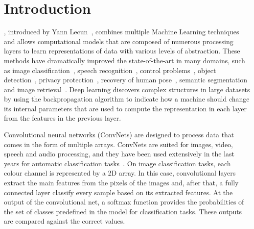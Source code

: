 \documentclass[journal]{IEEEtran}
\begin{document}
	\section{Introduction}
	\label{sect:introduction}
	, introduced by Yann Lecun~\cite{lecun2015deep}, combines multiple Machine Learning techniques and allows computational models that are composed of numerous processing layers to learn representations of data with various levels of abstraction. These methods have dramatically improved the state-of-the-art in many domains, such as image classification~\cite{cirecsan2012multi, he2016deep, krizhevsky2012imagenet}, speech recognition~\cite{hinton2012deep}, control problems~\cite{mnih2015human}, object detection~\cite{jiang2016speed, girshick2014rich}, privacy protection~\cite{yu2017iprivacy}, recovery of human pose~\cite{hong2015multimodal}, semantic segmentation~\cite{long2015fully} and image retrieval~\cite{li2015weakly}. Deep learning discovers complex structures in large datasets by using the backpropagation algorithm to indicate how a machine should change its internal parameters that are used to compute the representation in each layer from the features in the previous layer.
	
	Convolutional neural networks (ConvNets) are designed to process data that comes in the form of multiple arrays. ConvNets are suited for images, video, speech and audio processing, and they have been used extensively in the last years for automatic classification tasks~\cite{dong2014learning, sun2013deep, ronneberger2015u}. On image classification tasks, each colour channel is represented by a 2D array. In this case, convolutional layers extract the main features from the pixels of the images and, after that, a fully connected layer classify every sample based on its extracted features. At the output of the convolutional net, a softmax function provides the probabilities of the set of classes predefined in the model for classification tasks. These outputs are compared against the correct values.
	
\end{document}
